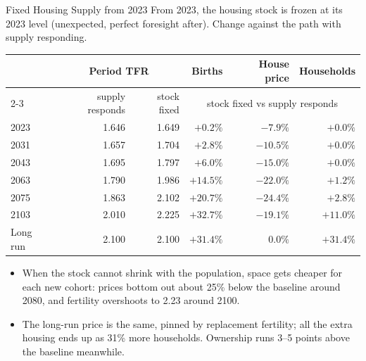 \begin{frame}[t]{Fixed Housing Supply from 2023}
\linespread{1.0}\footnotesize\selectfont
From 2023, the housing stock is frozen at its 2023 level (unexpected, perfect foresight after). Change against the path with supply responding.
\smallskip

\scriptsize\setlength{\tabcolsep}{5pt}\renewcommand{\arraystretch}{0.95}
\begin{tabularx}{\textwidth}{@{}Xrrrrr@{}}
\toprule
 & \multicolumn{2}{c}{Period TFR} & Births & House price & Households \\
\cmidrule(lr){2-3}
 & supply responds & stock fixed & \multicolumn{3}{c}{stock fixed vs supply responds} \\
\midrule
2023 & 1.646 & 1.649 & $+0.2\%$ & $-7.9\%$ & $+0.0\%$ \\
2031 & 1.657 & 1.704 & $+2.8\%$ & $-10.5\%$ & $+0.0\%$ \\
2043 & 1.695 & 1.797 & $+6.0\%$ & $-15.0\%$ & $+0.0\%$ \\
2063 & 1.790 & 1.986 & $+14.5\%$ & $-22.0\%$ & $+1.2\%$ \\
2075 & 1.863 & 2.102 & $+20.7\%$ & $-24.4\%$ & $+2.8\%$ \\
2103 & 2.010 & 2.225 & $+32.7\%$ & $-19.1\%$ & $+11.0\%$ \\
\midrule
Long run & 2.100 & 2.100 & $+31.4\%$ & $0.0\%$ & $+31.4\%$ \\
\bottomrule
\end{tabularx}
\smallskip

\footnotesize
\begin{itemize}\setlength\itemsep{1pt}\setlength\topsep{2pt}
\item When the stock cannot shrink with the population, space gets cheaper for each new cohort: prices bottom out about 25\% below the baseline around 2080, and fertility overshoots to 2.23 around 2100.
\item The long-run price is the same, pinned by replacement fertility; all the extra housing ends up as 31\% more households. Ownership runs 3--5 points above the baseline meanwhile.
\end{itemize}

\end{frame}

